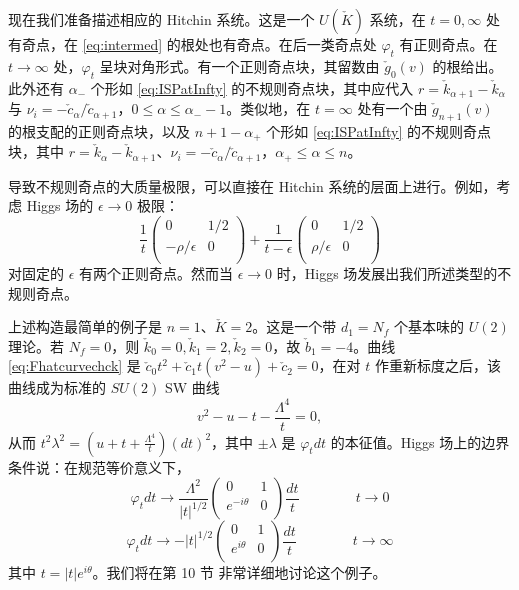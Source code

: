 现在我们准备描述相应的 Hitchin 系统。这是一个 $U(\check K)$ 系统，在 $t=0,\infty$ 处有奇点，在 \eqref{eq:intermed} 的根处也有奇点。在后一类奇点处 $\varphi_t$ 有正则奇点。在 $t\to
\infty$ 处，$\varphi_t$ 呈块对角形式。有一个正则奇点块，其留数由 $\check g_0(v)$ 的根给出。此外还有 $\alpha_-$ 个形如 \eqref{eq:ISPatInfty} 的不规则奇点块，其中应代入 $r= \check k_{\alpha +1}-\check k_{\alpha}$ 与 $\nu_i = - \check c_{\alpha}/\check c_{\alpha +1}$，$0\leq \alpha \leq \alpha_--1$。类似地，在 $t =\infty$ 处有一个由 $\check g_{n+1}(v)$ 的根支配的正则奇点块，以及 $n+1-\alpha_+$ 个形如 \eqref{eq:ISPatInfty} 的不规则奇点块，其中 $r= \check k_{\alpha}-\check k_{\alpha +1}$、$\nu_i = - \check c_{\alpha}/\check c_{\alpha +1}$，$\alpha_+\leq \alpha \leq n$。

导致不规则奇点的大质量极限，可以直接在 Hitchin 系统的层面上进行。例如，考虑 Higgs 场的 $\epsilon\to 0$ 极限：
\begin{equation}\label{eq:ch05-epslimit}
\frac{1}{t} \begin{pmatrix} 0 & 1/2 \\ - \rho/\epsilon & 0 \\
\end{pmatrix} +\frac{1}{t-\epsilon} \begin{pmatrix} 0 & 1/2 \\ \rho/\epsilon & 0 \\
\end{pmatrix}
\end{equation}
对固定的 $\epsilon$ 有两个正则奇点。然而当 $\epsilon\to 0$ 时，Higgs 场发展出我们所述类型的不规则奇点。

上述构造最简单的例子是 $n=1$、$\check K=2$。这是一个带 $d_1 = N_f$ 个基本味的 $U(2)$ 理论。若 $N_f=0$，则 $\check k_0=0, \check k_1 = 2, \check k_2 =0$，故 $\check b_1 =
-4$。曲线 \eqref{eq:Fhatcurvechck} 是 $\check c_0 t^2 + \check c_1 t
(v^2-u) + \check c_2=0$，在对 $t$ 作重新标度之后，该曲线成为标准的 $SU(2)$ SW 曲线
\begin{equation}\label{eq:Standard-SU2-curve}
v^2 - u - t - \frac{\Lambda^4}{t} = 0,
\end{equation}
从而 $t^2 \lambda^2 =\left( u + t + \frac{\Lambda^4}{t}\right)
(dt)^2$，其中 $\pm \lambda$ 是 $\varphi_t dt$ 的本征值。Higgs 场上的边界条件说：在规范等价意义下，
\begin{equation}\label{eq:ch05-bc0}
\varphi_t dt \to \frac{\Lambda^2}{\vert t \vert^{1/2}}
\begin{pmatrix} 0 & 1 \\ e^{-i \theta} & 0 \\ \end{pmatrix}
\frac{dt}{t} \qquad\qquad t\to 0
\end{equation}
\begin{equation}\label{eq:ch05-bcinf}
\varphi_t dt \to -  \vert t \vert^{1/2}
\begin{pmatrix} 0 & 1 \\ e^{i \theta} & 0 \\ \end{pmatrix}
\frac{dt}{t} \qquad\qquad t\to \infty
\end{equation}
其中 $t = \vert t \vert e^{i \theta}$。我们将在第 10 节%
非常详细地讨论这个例子。
